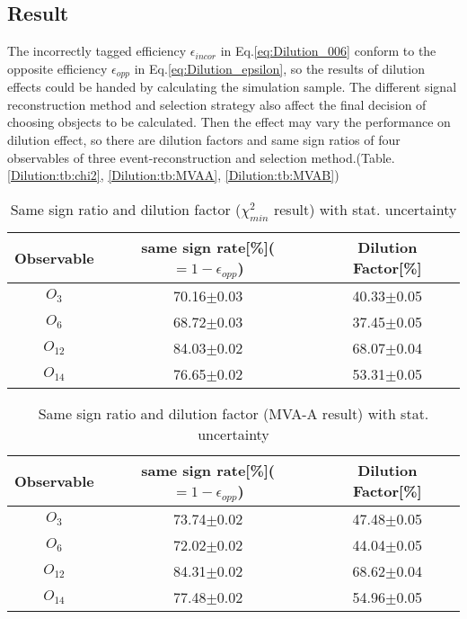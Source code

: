 	\subsection{Result}
	\label{Dilution:result}
		
		The incorrectly tagged efficiency $\epsilon_{incor}$ in Eq.\ref{eq:Dilution_006} conform to the opposite efficiency $\epsilon_{opp}$ in Eq.\ref{eq:Dilution_epsilon}, so the results of dilution effects could be handed by calculating the simulation sample. The different signal reconstruction method and selection strategy also affect the final decision of choosing obsjects to be calculated. Then the effect may vary the performance on dilution effect, so there are dilution factors and same sign ratios of four observables of three event-reconstruction and selection method.(Table. \ref{Dilution:tb:chi2}, \ref{Dilution:tb:MVAA}, \ref{Dilution:tb:MVAB})

		\begin{center}
		\setlength{\tabcolsep}{12pt}
		\begin{longtable}{ c | c c }
		\caption{Same sign ratio and dilution factor ($\chi^2_{min}$ result) with stat. uncertainty}\\
		\hline
		Observable & same sign rate[\%]($=1-\epsilon_{opp}$) & Dilution Factor[\%] \\
		\hline
		$O_{3}$ & 70.16$\pm$0.03  &  40.33$\pm$0.05  \\
		$O_{6}$ &  68.72$\pm$0.03  &  37.45$\pm$0.05  \\
		$O_{12}$ &  84.03$\pm$0.02  &  68.07$\pm$0.04  \\
		$O_{14}$ &  76.65$\pm$0.02  &  53.31$\pm$0.05  \\
		\hline
		\end{longtable}
		\label{Dilution:tb:chi2}
		\end{center}

		\begin{center}
		\setlength{\tabcolsep}{12pt}
		\begin{longtable}{ c | c c }
		\caption{Same sign ratio and dilution factor (MVA-A result) with stat. uncertainty}\\
		\hline
		Observable & same sign rate[\%]($=1-\epsilon_{opp}$) & Dilution Factor[\%] \\
		\hline
		$O_{3}$ & 73.74$\pm$0.02  &  47.48$\pm$0.05  \\
		$O_{6}$ &  72.02$\pm$0.02  &  44.04$\pm$0.05  \\
		$O_{12}$ &  84.31$\pm$0.02  &  68.62$\pm$0.04  \\
		$O_{14}$ &  77.48$\pm$0.02  &  54.96$\pm$0.05  \\
		\hline
		\end{longtable}
		\label{Dilution:tb:MVAA}
		\end{center}

